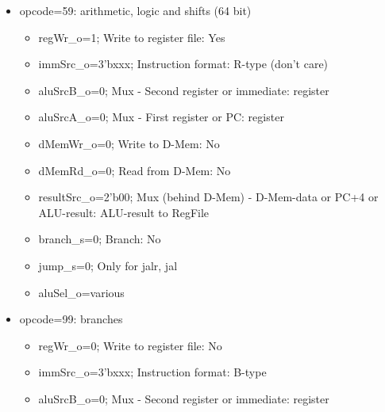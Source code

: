 \begin{itemize}
\begin{itemize}
\begin{itemize}
\begin{itemize}
        \item regWr\_o=1; Write to register file: Yes
        \item immSrc\_o=3'b100; Instruction format: U-type
        \item aluSrcB\_o=1; Mux - Second register or immediate: immediate
        \item aluSrcA\_o=0; Mux - First register or PC: register
        \item dMemWr\_o=0; Write to D-Mem: No
        \item dMemRd\_o=0; Read from D-Mem: No
        \item resultSrc\_o=2'b00; Mux (behind D-Mem) - D-Mem-data or PC+4 or ALU-result: ALU-result to RegFile
        \item branch\_s=0; Branch: No
        \item jump\_s=0; Only for jalr, jal
        \item aluSel\_o=5'b00000 (ADD)
      \end{itemize}
      \item opcode=59: arithmetic, logic and shifts (64 bit)
      \begin{itemize}
        \item regWr\_o=1; Write to register file: Yes
        \item immSrc\_o=3'bxxx; Instruction format: R-type (don't care)
        \item aluSrcB\_o=0; Mux - Second register or immediate: register
        \item aluSrcA\_o=0; Mux - First register or PC: register
        \item dMemWr\_o=0; Write to D-Mem: No
        \item dMemRd\_o=0; Read from D-Mem: No
        \item resultSrc\_o=2'b00; Mux (behind D-Mem) - D-Mem-data or PC+4 or ALU-result: ALU-result to RegFile
        \item branch\_s=0; Branch: No
        \item jump\_s=0; Only for jalr, jal
        \item aluSel\_o=various
      \end{itemize}
      \item opcode=99: branches
      \begin{itemize}
        \item regWr\_o=0; Write to register file: No
        \item immSrc\_o=3'bxxx; Instruction format: B-type
        \item aluSrcB\_o=0; Mux - Second register or immediate: register

\end{itemize}
\end{itemize}
\end{itemize}
\end{itemize}
